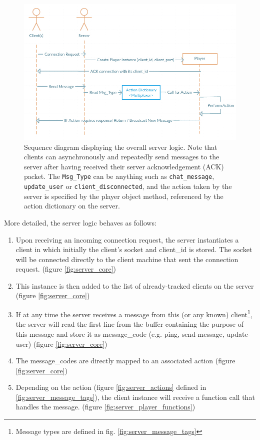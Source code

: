 \documentclass[bsc,frontabs,twoside,singlespacing,parskip,deptreport]{infthesis}     %
\begin{document}
\begin{figure}[H]
\includegraphics[scale=0.60]{images/server_sequence_diagram.jpg}
\caption{Sequence diagram displaying the overall server logic. Note that clients can asynchronously and repeatedly send messages to the server after having received their server acknowledgement (ACK) packet. The \texttt{Msg\_Type} can be anything such as \texttt{chat\_message}, \texttt{update\_user} or \texttt{client\_disconnected}, and the action taken by the server is specified by the player object method, referenced by the action dictionary on the server.}
\label{fig:server_sequence_diagram}
\end{figure}

More detailed, the server logic behaves as follows:
\begin{enumerate}
\item Upon receiving an incoming connection request, the server instantiates a client in which initially the client's socket and client\_id is stored. The socket will be connected directly to the client machine that sent the connection request. (figure \ref{fig:server_core})
\item This instance is then added to the list of already-tracked clients on the server (figure \ref{fig:server_core})
\item If at any time the server receives a message from this (or any known) client\footnote{Message types are defined in fig. \ref{fig:server_message_tags}}, the server will read the first line from the buffer containing the purpose of this message and store it as message\_code (e.g. ping, send-message, update-user) (figure \ref{fig:server_core})
\item The message\_codes are directly mapped to an associated action (figure \ref{fig:server_core})
\item Depending on the action (figure \ref{fig:server_actions} defined in \ref{fig:server_message_tags}), the client instance will receive a function call that handles the message. (figure \ref{fig:server_player_functions})
\end{enumerate}
\end{document}
